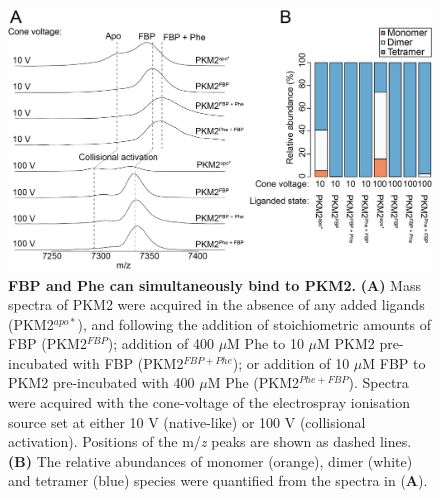 \begin{figure}[!ht]
\includegraphics[scale=0.7]{ch5_fig10_fbp_phe_hi_CV_ms.png}
\caption[FBP and Phe can simultaneously bind to PKM2.] {\textbf{FBP and Phe can simultaneously bind to PKM2.} \textbf{(A)} Mass spectra of PKM2 were acquired in the absence of any added ligands (PKM2$^{apo \ast}$), and following the addition of stoichiometric amounts of FBP (PKM2$^{FBP}$); addition of 400 $\mu$M Phe to 10 $\mu$M PKM2 pre-incubated with FBP (PKM2$^{FBP+Phe}$); or addition of 10 $\mu$M FBP to PKM2 pre-incubated with 400 $\mu$M Phe (PKM2$^{Phe+FBP}$). Spectra were acquired with the cone-voltage of the electrospray ionisation source set at either 10 V (native-like) or 100 V (collisional activation). Positions of the m/\textit{z} peaks are shown as dashed lines. \textbf{(B)} The relative abundances of monomer (orange), dimer (white) and tetramer (blue) species were quantified from the spectra in (\textbf{A}).}
\label{fig:fbp_phe_binding_ms}
\end{figure}

\clearpage

